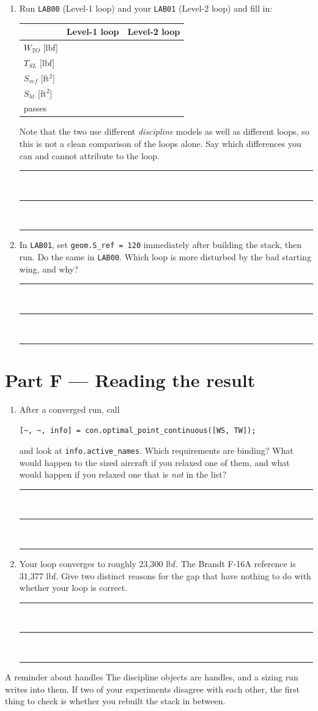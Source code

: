 \documentclass[11pt, a4paper]{article}
\newcommand{\answerspace}[1]{\vspace{#1}\noindent\rule{\linewidth}{0.3pt}\\[2mm]
  \noindent\rule{\linewidth}{0.3pt}\\[2mm]\noindent\rule{\linewidth}{0.3pt}\vspace{3mm}}
\begin{document}
\begin{enumerate}[leftmargin=*, itemsep=3mm, resume]

\item Run \texttt{LAB00} (Level-1 loop) and your \texttt{LAB01} (Level-2 loop)
and fill in:

\begin{center}
\begin{tabular}{@{}lcc@{}}
\toprule
& Level-1 loop & Level-2 loop \\
\midrule
$W_{TO}$ [lbf]  & & \\[2mm]
$T_{SL}$ [lbf]  & & \\[2mm]
$S_{ref}$ [ft$^2$] & & \\[2mm]
$S_{ht}$ [ft$^2$]  & & \\[2mm]
passes          & & \\
\bottomrule
\end{tabular}
\end{center}

Note that the two use different \emph{discipline} models as well as different
loops, so this is not a clean comparison of the loops alone. Say which
differences you can and cannot attribute to the loop.
\answerspace{12mm}

\item In \texttt{LAB01}, set \texttt{geom.S\_ref = 120} immediately after
building the stack, then run. Do the same in \texttt{LAB00}. Which loop is more
disturbed by the bad starting wing, and why?
\answerspace{12mm}

\end{enumerate}

\section*{Part F --- Reading the result}

\begin{enumerate}[leftmargin=*, itemsep=3mm, resume]

\item After a converged run, call
\begin{center}
\texttt{[\textasciitilde, \textasciitilde, info] = con.optimal\_point\_continuous([WS, TW]);}
\end{center}
and look at \texttt{info.active\_names}. Which requirements are binding? What
would happen to the sized aircraft if you relaxed one of them, and what would
happen if you relaxed one that is \emph{not} in the list?
\answerspace{14mm}

\item Your loop converges to roughly 23{,}300 lbf. The Brandt F-16A reference
is 31{,}377 lbf. Give two distinct reasons for the gap that have nothing to do
with whether your loop is correct.
\answerspace{14mm}

\end{enumerate}

\vfill
\begin{warnbox}{A reminder about handles}
The discipline objects are handles, and a sizing run writes into them. If two
of your experiments disagree with each other, the first thing to check is
whether you rebuilt the stack in between.
\end{warnbox}
\end{document}
